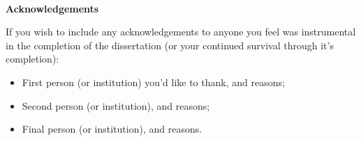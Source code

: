 \ 


\newpage

\begin{center}{\Large\bf Acknowledgements}\end{center}

\vspace{0.3cm}

\noindent If you wish to include any acknowledgements to anyone you feel was instrumental in the completion of the dissertation (or your continued survival through it's completion):
\begin{itemize}
	\item First person (or institution) you'd like to thank, and reasons;

	\item Second person (or institution), and reasons;

	\item Final person (or institution), and reasons.
\end{itemize}


\cleardoublepage
\pagestyle{plain}
\setcounter{page}{1}
\ifpdf
{}
\fi
\tableofcontents


\cleardoublepage
\ifpdf
{}
\fi
{}
\listoffigures


\cleardoublepage
\ifpdf
{}
\fi
{}


\cleardoublepage
\ifpdf
{}
\fi
{}


\cleardoublepage
\ifpdf
{}
\fi
{}
\listoftables

